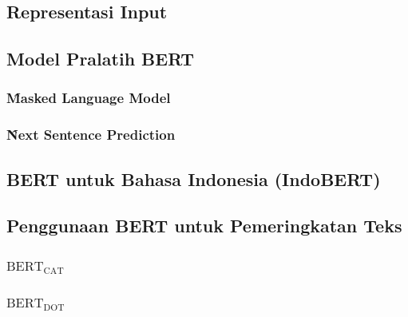 	\subsection{Representasi Input}
	
	\subsection{Model Pralatih BERT}

		\subsubsection{\f{Masked Language Model}}

		\subsubsection{\f{Next Sentence Prediction}}

	\subsection{BERT untuk Bahasa Indonesia (IndoBERT)}

	\subsection{Penggunaan BERT untuk Pemeringkatan Teks}
		\subsubsection{$\text{BERT}_{\text{CAT}}$}

		\subsubsection{$\text{BERT}_{\text{DOT}}$}




